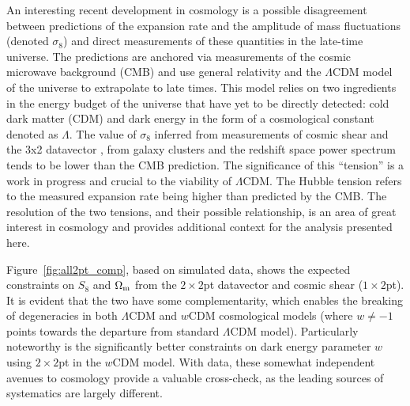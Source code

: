 \documentclass[aps, prd,twocolumn,superscriptaddress,nofootinbib,preprintnumbers]{revtex4-1}
\begin{document}


An interesting recent development in cosmology is a possible disagreement between predictions of the expansion rate and the amplitude of mass fluctuations (denoted $\sigma_8$) and direct measurements of these quantities in the late-time universe. The predictions are anchored via measurements of the cosmic microwave background (CMB) and use general relativity and the $\Lambda$CDM model of the universe to extrapolate to late times. This model relies on two ingredients in the energy budget of the universe that have yet to be directly detected: cold dark matter (CDM) and dark energy in the form of a cosmological constant denoted as $\Lambda$. The value of $\sigma_8$ inferred from measurements of cosmic shear and the 3x2 datavector \citep{Abbott_2018,Troxel_2018, Heymans_2021, Hikage_2019, y3-3x2ptkp, y3-cosmicshear1, y3-cosmicshear2}, from galaxy clusters \citep{Abbott_2020_clusters,To_2021} and the redshift space power spectrum \citep{Philcox_2020} tends to be lower than the CMB prediction. The significance of this ``tension''  is a work in progress and crucial to the viability of $\Lambda$CDM. The Hubble tension refers to the measured expansion rate being higher than predicted by the CMB. The resolution of the two tensions, and their possible relationship, is an area of great interest in cosmology and provides additional context for the analysis presented here. 

Figure~\ref{fig:all2pt_comp}, based on simulated data, shows the expected constraints on $S_8$ and $\Omega_{\rm m}$ from the $2\times2$pt datavector and cosmic shear ($1\times 2$pt). It is evident that the two have some complementarity, which enables the breaking of degeneracies in both $\Lambda$CDM and $w$CDM cosmological models (where $w \neq -1$ points towards the departure from standard $\Lambda$CDM model). Particularly noteworthy is the significantly better constraints on dark energy parameter $w$ using $2\times2$pt in the $w$CDM model. With data, these somewhat independent avenues to cosmology provide a valuable cross-check, as the leading sources of systematics are largely different. 
\end{document}
